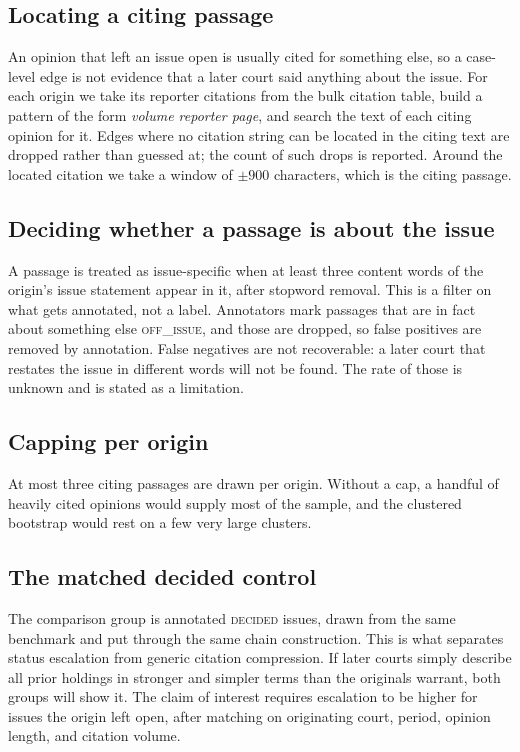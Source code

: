 \subsection{Locating a citing passage} An opinion that left an issue open is
usually cited for something else, so a case-level edge is not evidence that a
later court said anything about the issue. For each origin we take its reporter
citations from the bulk citation table, build a pattern of the form
\emph{volume reporter page}, and search the text of each citing opinion for it.
Edges where no citation string can be located in the citing text are dropped
rather than guessed at; the count of such drops is reported. Around the located
citation we take a window of $\pm900$ characters, which is the citing passage.

\subsection{Deciding whether a passage is about the issue} A passage is treated
as issue-specific when at least three content words of the origin's issue
statement appear in it, after stopword removal. This is a filter on what gets
annotated, not a label. Annotators mark passages that are in fact about
something else \textsc{off\_issue}, and those are dropped, so false positives are
removed by annotation. False negatives are not recoverable: a later court that
restates the issue in different words will not be found. The rate of those is
unknown and is stated as a limitation.

\subsection{Capping per origin} At most three citing passages are drawn per
origin. Without a cap, a handful of heavily cited opinions would supply most of
the sample, and the clustered bootstrap would rest on a few very large clusters.

\subsection{The matched decided control} The comparison group is annotated
\textsc{decided} issues, drawn from the same benchmark and put through the same
chain construction. This is what separates status escalation from generic
citation compression. If later courts simply describe all prior holdings in
stronger and simpler terms than the originals warrant, both groups will show it.
The claim of interest requires escalation to be higher for issues the origin left
open, after matching on originating court, period, opinion length, and citation
volume.

